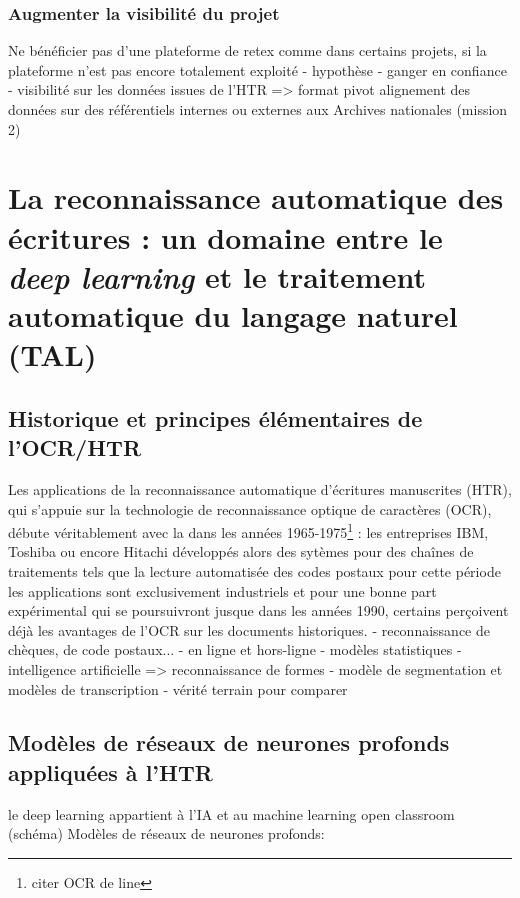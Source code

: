 \subsection{Augmenter la visibilité du projet}

Ne bénéficier pas d'une plateforme de retex comme dans certains projets, si la plateforme n'est pas encore totalement exploité
- hypothèse
- ganger en confiance
- visibilité sur les données issues de l'HTR => format pivot alignement des données sur des référentiels internes ou externes aux Archives nationales (mission 2)

\chapter{La reconnaissance automatique des écritures : un domaine entre le \textit{deep learning} et le traitement automatique du langage naturel (TAL)}

\section{Historique et principes élémentaires de l'OCR/HTR}


Les applications de la reconnaissance automatique d'écritures manuscrites (HTR), qui s'appuie sur la technologie de reconnaissance optique de caractères (OCR), débute véritablement avec la  dans les années 1965-1975\footnote{citer OCR de line} : les entreprises IBM, Toshiba ou encore Hitachi développés alors des sytèmes pour des chaînes de traitements tels que la lecture automatisée des codes postaux pour cette période les applications sont exclusivement industriels et pour une bonne part expérimental qui se poursuivront jusque dans les années 1990, certains perçoivent déjà les avantages de l'OCR sur les documents historiques.
- reconnaissance de chèques, de code postaux...
- en ligne et hors-ligne
- modèles statistiques 
- intelligence artificielle => reconnaissance de formes 
- modèle de segmentation et modèles de transcription
- vérité terrain pour comparer 

\section{Modèles de réseaux de neurones profonds appliquées à l'HTR}

le deep learning appartient à l'IA et au machine learning open classroom (schéma)
Modèles de réseaux de neurones profonds: 

